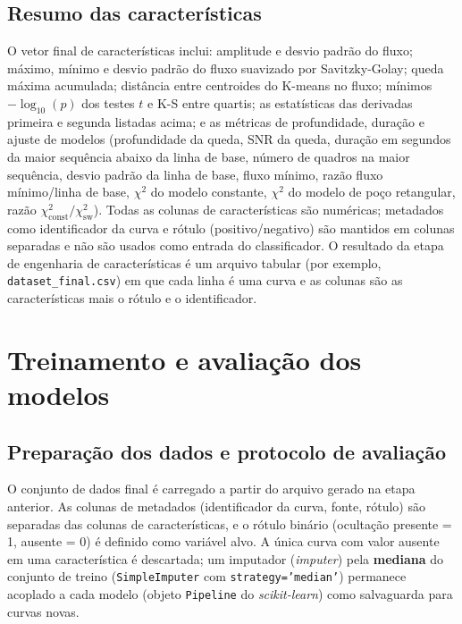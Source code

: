 \subsection{Resumo das características}

O vetor final de características inclui: amplitude e desvio padrão do fluxo; máximo, mínimo e desvio padrão do fluxo suavizado por Savitzky-Golay; queda máxima acumulada; distância entre centroides do K-means no fluxo; mínimos \(-\log_{10}(p)\) dos testes \(t\) e K-S entre quartis; as estatísticas das derivadas primeira e segunda listadas acima; e as métricas de profundidade, duração e ajuste de modelos (profundidade da queda, SNR da queda, duração em segundos da maior sequência abaixo da linha de base, número de quadros na maior sequência, desvio padrão da linha de base, fluxo mínimo, razão fluxo mínimo/linha de base, \(\chi^2\) do modelo constante, \(\chi^2\) do modelo de poço retangular, razão \(\chi^2_{\mathrm{const}}/\chi^2_{\mathrm{sw}}\)). Todas as colunas de características são numéricas; metadados como identificador da curva e rótulo (positivo/negativo) são mantidos em colunas separadas e não são usados como entrada do classificador. O resultado da etapa de engenharia de características é um arquivo tabular (por exemplo, \texttt{dataset\_final.csv}) em que cada linha é uma curva e as colunas são as características mais o rótulo e o identificador.

\section{Treinamento e avaliação dos modelos}
\label{sec:treinamento}

\subsection{Preparação dos dados e protocolo de avaliação}

O conjunto de dados final é carregado a partir do arquivo gerado na etapa anterior. As colunas de metadados (identificador da curva, fonte, rótulo) são separadas das colunas de características, e o rótulo binário (ocultação presente = 1, ausente = 0) é definido como variável alvo. A única curva com valor ausente em uma característica é descartada; um imputador (\textit{imputer}) pela \textbf{mediana} do conjunto de treino (\texttt{SimpleImputer} com \texttt{strategy='median'}) permanece acoplado a cada modelo (objeto \texttt{Pipeline} do \textit{scikit-learn}) como salvaguarda para curvas novas.

